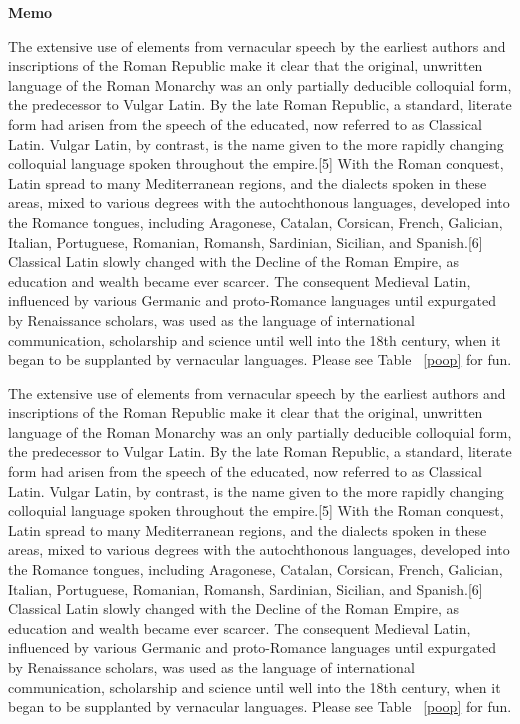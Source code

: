 \documentclass{paper}
\begin{document}

\textbf{Memo}

The extensive use of elements from vernacular speech by the earliest authors and inscriptions of the Roman Republic make it clear that the original, unwritten language of the Roman Monarchy was an only partially deducible colloquial form, the predecessor to Vulgar Latin. By the late Roman Republic, a standard, literate form had arisen from the speech of the educated, now referred to as Classical Latin. Vulgar Latin, by contrast, is the name given to the more rapidly changing colloquial language spoken throughout the empire.[5] With the Roman conquest, Latin spread to many Mediterranean regions, and the dialects spoken in these areas, mixed to various degrees with the autochthonous languages, developed into the Romance tongues, including Aragonese, Catalan, Corsican, French, Galician, Italian, Portuguese, Romanian, Romansh, Sardinian, Sicilian, and Spanish.[6] Classical Latin slowly changed with the Decline of the Roman Empire, as education and wealth became ever scarcer. The consequent Medieval Latin, influenced by various Germanic and proto-Romance languages until expurgated by Renaissance scholars, was used as the language of international communication, scholarship and science until well into the 18th century, when it began to be supplanted by vernacular languages. Please see Table ~\ref{poop} for fun.


The extensive use of elements from vernacular speech by the earliest authors and inscriptions of the Roman Republic make it clear that the original, unwritten language of the Roman Monarchy was an only partially deducible colloquial form, the predecessor to Vulgar Latin. By the late Roman Republic, a standard, literate form had arisen from the speech of the educated, now referred to as Classical Latin. Vulgar Latin, by contrast, is the name given to the more rapidly changing colloquial language spoken throughout the empire.[5] With the Roman conquest, Latin spread to many Mediterranean regions, and the dialects spoken in these areas, mixed to various degrees with the autochthonous languages, developed into the Romance tongues, including Aragonese, Catalan, Corsican, French, Galician, Italian, Portuguese, Romanian, Romansh, Sardinian, Sicilian, and Spanish.[6] Classical Latin slowly changed with the Decline of the Roman Empire, as education and wealth became ever scarcer. The consequent Medieval Latin, influenced by various Germanic and proto-Romance languages until expurgated by Renaissance scholars, was used as the language of international communication, scholarship and science until well into the 18th century, when it began to be supplanted by vernacular languages. Please see Table ~\ref{poop} for fun.
\end{document}
